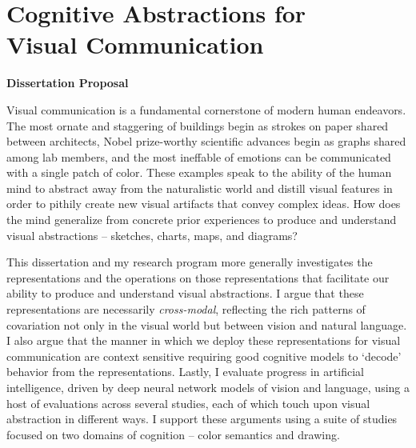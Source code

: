 \documentclass{Dissertate}
\begin{document}
\chapter*{\centering Cognitive Abstractions for \\ Visual Communication}

{\centering \large \textbf{Dissertation Proposal } \par}

\vspace{2mm}






Visual communication is a fundamental cornerstone of modern human endeavors.
The most ornate and staggering of buildings begin as strokes on paper shared between architects, Nobel prize-worthy scientific advances begin as graphs shared among lab members, and the most ineffable of emotions can be communicated with a single patch of color.
These examples speak to the ability of the human mind to abstract away from the naturalistic world and distill visual features in order to pithily create new visual artifacts that convey complex ideas.
How does the mind generalize from concrete prior experiences to produce and understand visual abstractions -- sketches, charts, maps, and diagrams?

This dissertation and my research program more generally investigates the representations and the operations on those representations that facilitate our ability to produce and understand visual abstractions.
I argue that these representations are necessarily \textit{cross-modal}, reflecting the rich patterns of covariation not only in the visual world but between vision and natural language. 
I also argue that the manner in which we deploy these representations for visual communication are context sensitive requiring good cognitive models to `decode' behavior from the representations.
Lastly, I evaluate progress in artificial intelligence, driven by deep neural network models of vision and language, using a host of evaluations across several studies, each of which touch upon visual abstraction in different ways.
I support these arguments using a suite of studies focused on two domains of cognition -- color semantics and drawing.
\end{document}
